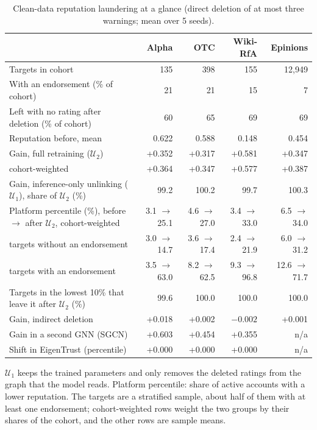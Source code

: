 \begin{table}[!t]
\centering
\caption{Clean-data reputation laundering at a glance (direct deletion of at most three warnings; mean over 5 seeds).}
\label{tab:laundering_glance}
\footnotesize
\setlength{\tabcolsep}{2.5pt}
\begin{tabular}{@{}>{\raggedright\arraybackslash}p{1.0in}rrrr@{}}
\toprule
 & \textbf{Alpha} & \textbf{OTC} & \textbf{Wiki-RfA} & \textbf{Epinions} \\
\midrule
Targets in cohort & 135 & 398 & 155 & 12{,}949 \\
With an endorsement (\% of cohort) & 21 & 21 & 15 & 7 \\
Left with no rating after deletion (\% of cohort) & 60 & 65 & 69 & 69 \\
Reputation before, mean & 0.622 & 0.588 & 0.148 & 0.454 \\
Gain, full retraining ($\mathcal{U}_2$) & +0.352 & +0.317 & +0.581 & +0.347 \\
\quad cohort-weighted & +0.364 & +0.347 & +0.577 & +0.387 \\
Gain, inference-only unlinking ($\mathcal{U}_1$), share of $\mathcal{U}_2$ (\%) & 99.2 & 100.2 & 99.7 & 100.3 \\
Platform percentile (\%), before $\to$ after $\mathcal{U}_2$, cohort-weighted & 3.1 $\to$ 25.1 & 4.6 $\to$ 27.0 & 3.4 $\to$ 33.0 & 6.5 $\to$ 34.0 \\
\quad targets without an endorsement & 3.0 $\to$ 14.7 & 3.6 $\to$ 17.4 & 2.4 $\to$ 21.9 & 6.0 $\to$ 31.2 \\
\quad targets with an endorsement & 3.5 $\to$ 63.0 & 8.2 $\to$ 62.5 & 9.3 $\to$ 96.8 & 12.6 $\to$ 71.7 \\
Targets in the lowest 10\% that leave it after $\mathcal{U}_2$ (\%) & 99.6 & 100.0 & 100.0 & 100.0 \\
Gain, indirect deletion & +0.018 & +0.002 & $-0.002$ & +0.001 \\
Gain in a second GNN (SGCN) & +0.603 & +0.454 & +0.355 & n/a \\
Shift in EigenTrust (percentile) & +0.000 & +0.000 & +0.000 & n/a \\
\bottomrule
\end{tabular}
\par\smallskip
\parbox{\columnwidth}{\scriptsize $\mathcal{U}_1$ keeps the trained parameters and only removes the deleted ratings from the graph that the model reads. Platform percentile: share of active accounts with a lower reputation. The targets are a stratified sample, about half of them with at least one endorsement; cohort-weighted rows weight the two groups by their shares of the cohort, and the other rows are sample means.}
\end{table}

